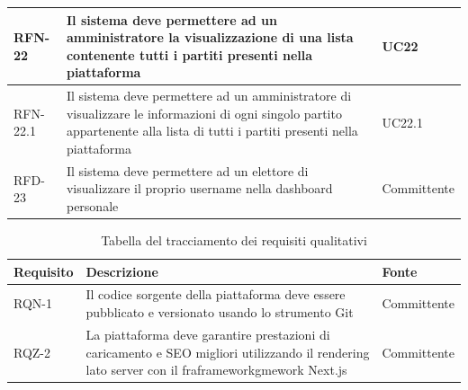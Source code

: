 \begin{longtable}{| p{} | p{} | p{} |}
\hline

RFN-22     & Il sistema deve permettere ad un amministratore la visualizzazione di una lista contenente tutti i partiti presenti nella piattaforma & UC22 \\

\hline

RFN-22.1     & Il sistema deve permettere ad un amministratore di visualizzare le informazioni di ogni singolo partito appartenente alla lista di tutti i partiti presenti nella piattaforma & UC22.1 \\

\hline

RFD-23     & Il sistema deve permettere ad un elettore di visualizzare il proprio username nella dashboard personale & Committente \\

\hline

\end{longtable}

\begin{longtable}{| p{} | p{} | p{} |}
\caption{Tabella del tracciamento dei requisiti qualitativi}
\label{tab:requisiti-qualitativi}
\hline
\textbf{Requisito} & \textbf{Descrizione} & \textbf{Fonte}\\

\hline

RQN-1    & Il codice sorgente della piattaforma deve essere pubblicato e versionato usando lo strumento Git  & Committente \\

\hline

RQZ-2    & La piattaforma deve garantire prestazioni di caricamento e SEO migliori utilizzando il rendering lato server con il fra\gls{frameworkg}mework Next.js & Committente \\

\hline
\end{longtable}

